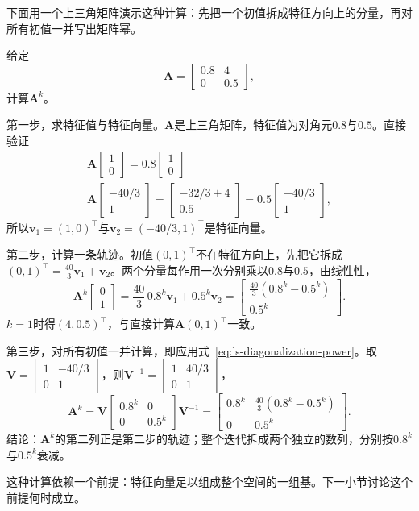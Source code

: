 下面用一个上三角矩阵演示这种计算：先把一个初值拆成特征方向上的分量，再对所有初值一并写出矩阵幂。
\begin{example}[用特征向量计算矩阵幂]
\label{ex:ls-triangular-power}
给定
\[
 \bm A=\begin{bmatrix}0.8&4\\0&0.5\end{bmatrix},
\]
计算$\bm A^k$。

第一步，求特征值与特征向量。$\bm A$是上三角矩阵，特征值为对角元$0.8$与$0.5$。直接验证
\[
\begin{gathered}
\bm A\begin{bmatrix}1\\0\end{bmatrix}=0.8\begin{bmatrix}1\\0\end{bmatrix}\\
\bm A\begin{bmatrix}-40/3\\1\end{bmatrix}
 =\begin{bmatrix}-32/3+4\\0.5\end{bmatrix}
 =0.5\begin{bmatrix}-40/3\\1\end{bmatrix},
\end{gathered}
\]
所以$\bm v_1=(1,0)^{\top}$与$\bm v_2=(-40/3,1)^{\top}$是特征向量。

第二步，计算一条轨迹。初值$(0,1)^{\top}$不在特征方向上，先把它拆成$(0,1)^{\top}=\tfrac{40}{3}\bm v_1+\bm v_2$。两个分量每作用一次分别乘以$0.8$与$0.5$，由线性性，
\[
 \bm A^k\begin{bmatrix}0\\1\end{bmatrix}
 =\frac{40}{3}\,0.8^k\bm v_1+0.5^k\bm v_2
 =\begin{bmatrix}\tfrac{40}{3}(0.8^k-0.5^k)\\0.5^k\end{bmatrix}.
\]
$k=1$时得$(4,0.5)^{\top}$，与直接计算$\bm A(0,1)^{\top}$一致。

第三步，对所有初值一并计算，即应用式~\eqref{eq:ls-diagonalization-power}。取$\bm V=\left[\begin{smallmatrix}1&-40/3\\0&1\end{smallmatrix}\right]$，则$\bm V^{-1}=\left[\begin{smallmatrix}1&40/3\\0&1\end{smallmatrix}\right]$，
\[
 \bm A^k=\bm V\begin{bmatrix}0.8^k&0\\0&0.5^k\end{bmatrix}\bm V^{-1}
 =\begin{bmatrix}0.8^k&\tfrac{40}{3}(0.8^k-0.5^k)\\0&0.5^k\end{bmatrix}.
\]
结论：$\bm A^k$的第二列正是第二步的轨迹；整个迭代拆成两个独立的数列，分别按$0.8^k$与$0.5^k$衰减。
\end{example}
这种计算依赖一个前提：特征向量足以组成整个空间的一组基。下一小节讨论这个前提何时成立。

